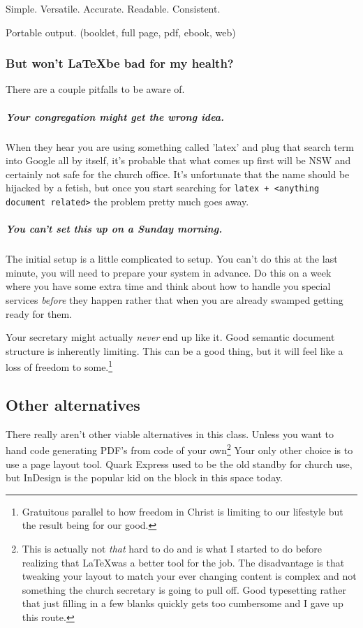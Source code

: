 \documentclass[12pt]{scrartcl}
\begin{document}
Simple. Versatile. Accurate. Readable. Consistent.

Portable output. (booklet, full page, pdf, ebook, web)

\subsubsection{But won't \LaTeX be bad for my health?}

There are a couple pitfalls to be aware of.

\subparagraph{Your congregation might get the wrong idea.}

When they hear you are using something called 'latex' and plug that search term
into Google all by itself, it's probable that what comes up first will be NSW
and certainly not safe for the church office. It's unfortunate that the name
should be hijacked by a fetish, but once you start searching for \texttt{latex +
	<anything document related>} the problem pretty much goes away.

\subparagraph{You can't set this up on a Sunday morning.}

The initial setup is a little complicated to setup. You can't do this at the
last minute, you will need to prepare your system in advance. Do this on a week
where you have some extra time and think about how to handle you special
services \emph{before} they happen rather that when you are already swamped
getting ready for them.

Your secretary might actually \emph{never} end up like it. Good semantic
document structure is inherently limiting. This can be a good thing, but it will
feel like a loss of freedom to some.\footnote{Gratuitous parallel to how freedom
	in Christ is limiting to our lifestyle but the result being for our
	good.}

\subsection{Other alternatives}

There really aren't other viable alternatives in this class. Unless you want to
hand code generating PDF's from code of your own\footnote{This is actually not
	\emph{that} hard to do and is what I started to do before realizing that
	\LaTeX was a better tool for the job. The disadvantage is that tweaking
	your layout to match your ever changing content is complex and not
	something the church secretary is going to pull off. Good typesetting
	rather that just filling in a few blanks quickly gets too cumbersome and
	I gave up this route.} Your only other choice is to use a page layout
tool. Quark Express used to be the old standby for church use, but InDesign is
the popular kid on the block in this space today.
\end{document}
